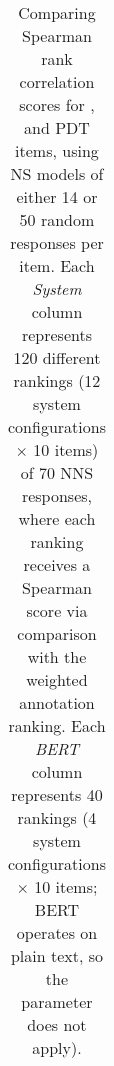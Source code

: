 \begin{table}[htb!]
\begin{center}
\begin{tabular}{|l||l|l||l|l||l|l|}
\hline
\end{tabular}
\caption{\label{tab:transitivity-results} Comparing Spearman rank correlation scores for ,  and  PDT items, using NS models of either 14 or 50 random responses per item. Each \textit{System} column represents 120 different rankings (12 system configurations $\times$ 10 items) of 70 NNS responses, where each ranking receives a Spearman score via comparison with the weighted annotation ranking. Each \textit{BERT} column represents 40 rankings (4 system configurations $\times$ 10 items; BERT operates on plain text, so the  parameter does not apply).
}
\end{center}
\end{table}





